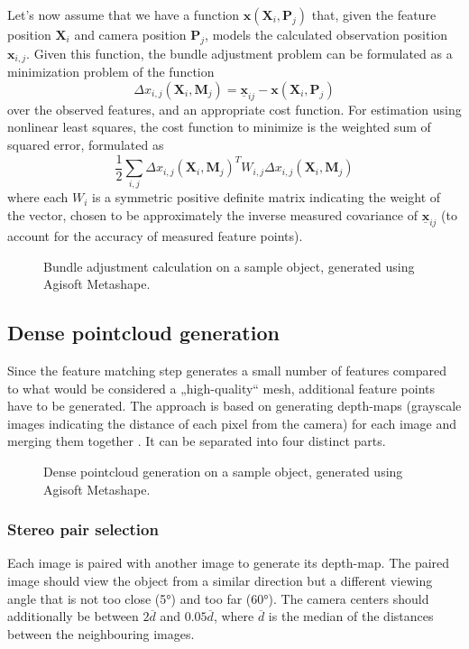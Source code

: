Let's now assume that we have a function $\bm{x}(\mathbf{X}_i, \mathbf{P}_j)$ that, given the feature position $\mathbf{X}_i$ and camera position $\mathbf{P}_j$, models the calculated observation position $\mathbf{x}_{i, j}$.
Given this function, the bundle adjustment problem can be formulated as a minimization problem of the function \begin{equation} \Delta x_{i, j} (\mathbf{X}_i, \mathbf{M}_j) = \underline{\bm{x}}_{ij} - \bm{x}(\mathbf{X}_i, \mathbf{P}_j) \end{equation}
over the observed features, and an appropriate cost function. For estimation using nonlinear least squares, the cost function to minimize is the weighted sum of squared error, formulated as 
\begin{equation} \frac{1}{2} \sum_{i,j} \Delta x_{i, j} (\mathbf{X}_i, \mathbf{M}_j)^T W_{i,j} \Delta x_{i, j} (\mathbf{X}_i, \mathbf{M}_j) \end{equation}
where each $W_i$ is a symmetric positive definite matrix indicating the weight of the vector, chosen to be approximately the inverse measured covariance of $\underline{\bm{x}}_{ij}$ (to account for the accuracy of measured feature points).

\begin{figure}
	\centering
	\caption{Bundle adjustment calculation on a sample object, generated using Agisoft Metashape.}%
\end{figure}

\subsection{Dense pointcloud generation}
Since the feature matching step generates a small number of features compared to what would be considered a „high-quality“ mesh, additional feature points have to be generated.
The approach is based on generating depth-maps (grayscale images indicating the distance of each pixel from the camera) for each image and merging them together \cite{shen2013accurate}.
It can be separated into four distinct parts.

\begin{figure}[t]
	\centering
	\caption{Dense pointcloud generation on a sample object, generated using Agisoft Metashape.}%
\end{figure}

\subsubsection{Stereo pair selection}
Each image is paired with another image to generate its depth-map.
The paired image should view the object from a similar direction but a different viewing angle that is not too close (\ang{5}) and too far (\ang{60}).
The camera centers should additionally be between $2 \overline{d}$ and $0.05 \overline{d}$, where $\overline{d}$ is the median of the distances between the neighbouring images.

